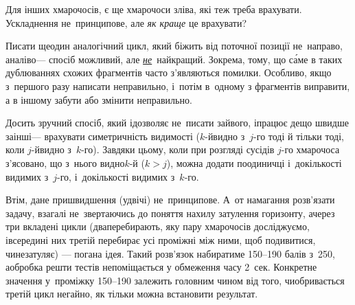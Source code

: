 Для інших хмарочосів, є ще хмарочоси зліва, які теж треба врахувати. Ускладнення не~принципове, але \emph{як краще} це врахувати?

Писати ще\nolinebreak[3] один аналогічний цикл, який біжить від поточної позиції не~направо, а\nolinebreak[3] наліво\nolinebreak[3] --- спосіб можливий, але \underline{\emph{не}}~найкращий. Зокрема, тому, що с\'{а}ме в таких дублюваннях схожих фрагментів часто з'являються помилки. Особливо, якщо з~першого разу написати неправильно, і~потім в~одному з фрагментів виправити, а в іншому забути або змінити неправильно.

Досить зручний спосіб, який і\nolinebreak[3] дозволяє не~писати зайвого, і\nolinebreak[3] працює дещо швидше за\nolinebreak[2] інші\nolinebreak[3] --- врахувати симетричність видимості (\mbox{$k$-й}\nolinebreak[3] видно з~\mbox{$j$-го} тоді й тільки тоді, коли \mbox{$j$-й}\nolinebreak[3] видно з~\mbox{$k$-го}). Завдяки цьому, коли при розгляді сусідів \mbox{$j$-го} хмарочоса з'ясовано, що з~нього видно\nolinebreak[2] \mbox{$k$-й} (${k{>}j}$), можна додати по\nolinebreak[3] одиничці і~до\nolinebreak[2] кількості видимих з~\mbox{$j$-го}, і~до\nolinebreak[2] кількості видимих з~\mbox{$k$-го}.

Втім, дане пришвидшення (удвічі) не~принципове. А~от намагання розв'язати задачу, взагалі не~звертаючись до поняття нахилу затулення горизонту, а\nolinebreak[3] через три вкладені цикли (два\nolinebreak[3] перебирають, яку пару хмарочосів досліджуємо, і\nolinebreak[3] всередині них третій перебирає усі проміжні між ними, щоб подивитися, чи\nolinebreak[2] не\nolinebreak[3] затуляє) --- погана ідея. Такий розв’язок набиратиме 150--190 балів з~250, а\nolinebreak[3] обробка решти тестів не\nolinebreak[3] поміщається у обмеження часу 2~сек. Конкретне значення у~проміжку 150--190 залежить головним чином від того, чи\nolinebreak[3] обривається третій цикл негайно, як тільки можна встановити результат. 
